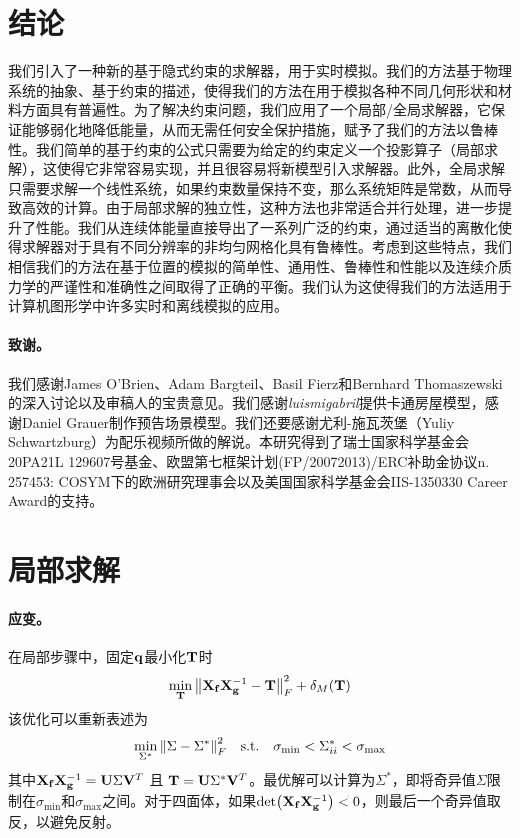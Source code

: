 \begin{translation}
\section{结论}

我们引入了一种新的基于隐式约束的求解器，用于实时模拟。我们的方法基于物理系统的抽象、基于约束的描述，使得我们的方法在用于模拟各种不同几何形状和材料方面具有普遍性。为了解决约束问题，我们应用了一个局部/全局求解器，它保证能够弱化地降低能量，从而无需任何安全保护措施，赋予了我们的方法以鲁棒性。我们简单的基于约束的公式只需要为给定的约束定义一个投影算子（局部求解），这使得它非常容易实现，并且很容易将新模型引入求解器。此外，全局求解只需要求解一个线性系统，如果约束数量保持不变，那么系统矩阵是常数，从而导致高效的计算。由于局部求解的独立性，这种方法也非常适合并行处理，进一步提升了性能。我们从连续体能量直接导出了一系列广泛的约束，通过适当的离散化使得求解器对于具有不同分辨率的非均匀网格化具有鲁棒性。考虑到这些特点，我们相信我们的方法在基于位置的模拟的简单性、通用性、鲁棒性和性能以及连续介质力学的严谨性和准确性之间取得了正确的平衡。我们认为这使得我们的方法适用于计算机图形学中许多实时和离线模拟的应用。

\paragraph{致谢。}

我们感谢James O'Brien、Adam Bargteil、Basil Fierz和Bernhard Thomaszewski的深入讨论以及审稿人的宝贵意见。我们感谢\emph{luismigabril}提供卡通房屋模型，感谢Daniel Grauer制作预告场景模型。我们还要感谢尤利-施瓦茨堡（Yuliy Schwartzburg）为配乐视频所做的解说。本研究得到了瑞士国家科学基金会20PA21L 129607号基金、欧盟第七框架计划(FP/20072013)/ERC补助金协议n. 257453: COSYM下的欧洲研究理事会以及美国国家科学基金会IIS-1350330 Career Award的支持。

\appendix

\section{局部求解}
\label{sec:translation-local-solves}


\paragraph{应变。}

在局部步骤中，固定$\vb{q}$最小化$\vb{T}$时
\begin{equation}
  \min_{\vb{T}} \norm{\vb{X}_{\vb{f}} \vb{X}_{\vb{g}}^{-1} - \vb{T}}_F^2 + \delta_M(\vb{T})
  \label{eq:translation-22}
\end{equation}
该优化可以重新表述为
\begin{equation}
  \min_{\Sigma^*} \norm{\Sigma - \Sigma^*}_F^2 \qq{s.t.} \sigma_{\min} < \Sigma_{ii}^* < \sigma_{\max}
  \label{eq:translation-23}
\end{equation}
其中$\vb{X}_{\vb{f}} \vb{X}_{\vb{g}}^{-1} = \vb{U} \Sigma \vb{V}^T$ 且 $\vb{T} = \vb{U} \Sigma^* \vb{V}^T$。最优解可以计算为$\Sigma^*$，即将奇异值$\Sigma$限制在$\sigma_{\min}$和$\sigma_{\max}$之间。对于四面体，如果$\det(\vb{X}_{\vb{f}} \vb{X}_{\vb{g}}^{-1}) < 0$，则最后一个奇异值取反，以避免反射。


\end{translation}
